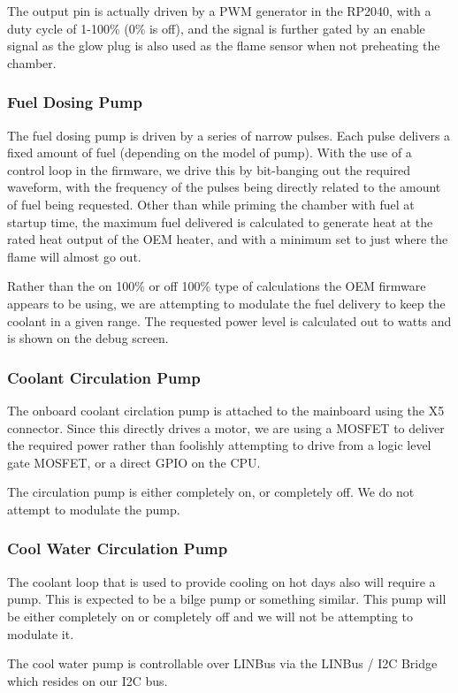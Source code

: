 \documentclass[lettersize,journal]{IEEEtran}
\begin{document}
The output pin is actually driven by a PWM generator in the RP2040, with a duty cycle of 1-100\% (0\% is off), and the signal is further gated by an enable signal as the glow plug is also used as the flame sensor when not preheating the chamber.

\subsubsection{Fuel Dosing Pump}
The fuel dosing pump is driven by a series of narrow pulses.  Each pulse delivers a fixed amount of fuel (depending on the model of pump).  With the use of a control loop in the firmware, we drive this by bit-banging out the required waveform, with the frequency of the pulses being directly related to the amount of fuel being requested.  Other than while priming the chamber with fuel at startup time, the maximum fuel delivered is calculated to generate heat at the rated heat output of the OEM heater, and with a minimum set to just where the flame will almost go out.

Rather than the on 100\% or off 100\% type of calculations the OEM firmware appears to be using, we are attempting to modulate the fuel delivery to keep the coolant in a given range.  The requested power level is calculated out to watts and is shown on the debug screen. 

\subsubsection{Coolant Circulation Pump}
The onboard coolant circlation pump is attached to the mainboard using the X5 connector.  Since this directly drives a motor, we are using a MOSFET to deliver the required power rather than foolishly attempting to drive from a logic level gate MOSFET, or a direct GPIO on the CPU.

The circulation pump is either completely on, or completely off.  We do not attempt to modulate the pump.

\subsubsection{Cool Water Circulation Pump}
The coolant loop that is used to provide cooling on hot days also will require a pump.  This is expected to be a bilge pump or something similar.  This pump will be either completely on or completely off and we will not be attempting to modulate it.

The cool water pump is controllable over LINBus via the LINBus / I2C Bridge which resides on our I2C bus.
\end{document}
